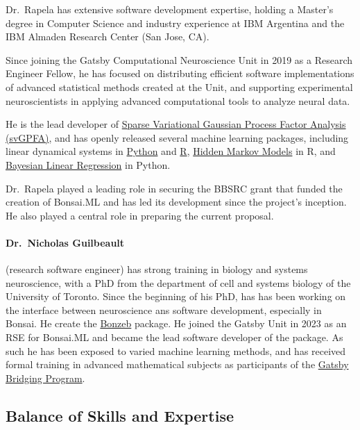 Dr.~Rapela has extensive software development expertise, holding a Master’s
degree in Computer Science and industry experience at IBM Argentina and the IBM
Almaden Research Center (San Jose, CA).

Since joining the Gatsby Computational Neuroscience Unit in 2019 as a Research
Engineer Fellow, he has focused on distributing efficient software
implementations of advanced statistical methods created at the Unit, and
supporting experimental neuroscientists in applying advanced computational
tools to analyze neural data.

He is the lead developer of \href{https://github.com/joacorapela/svGPFA}{Sparse
Variational Gaussian Process Factor Analysis (svGPFA)}, and has openly released
several machine learning packages, including linear dynamical systems in
\href{https://github.com/joacorapela/ssm}{Python} and
\href{https://github.com/joacorapela/kalmanFilter}{R},
\href{https://github.com/joacorapela/hiddenMarkovModels}{Hidden Markov Models}
in R, and
\href{https://github.com/joacorapela/bayesianLinearRegression}{Bayesian Linear
Regression} in Python.

Dr.~Rapela played a leading role in securing the BBSRC grant that funded the
creation of Bonsai.ML and has led its development since the project’s
inception. He also played a central role in preparing the current proposal.

\paragraph{Dr.~Nicholas Guilbeault} (research software engineer) has strong
training in biology and systems neuroscience, with a PhD from the department of
cell and systems biology of the University of Toronto.
%
Since the beginning of his PhD, has has been working on the interface between
neuroscience ans software development, especially in Bonsai. He create the
\href{https://ncguilbeault.github.io/BonZeb/}{Bonzeb} package.
%
He joined the Gatsby Unit in 2023 as an RSE for Bonsai.ML and became the lead
software developer of the package.
%
As such he has been exposed to varied machine learning methods, and has
received formal training in advanced mathematical subjects as participants of
the
\href{https://www.ucl.ac.uk/gatsby/study-and-work/gatsby-bridging-programme}{Gatsby
Bridging Program}.

\subsection*{Balance of Skills and Expertise}

